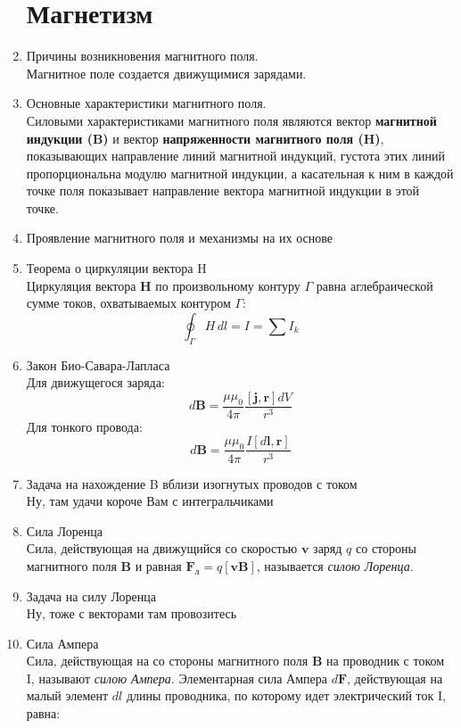 \documentclass[11pt]{article}
\begin{document}
	\begin{enumerate}
		\section{Магнетизм}
		\item Причины возникновения магнитного поля.\\
		Магнитное поле создается движущимися зарядами.
		\item Основные характеристики магнитного поля.\\
		Силовыми характеристиками магнитного поля являются вектор \textbf{магнитной индукции (B)} и вектор \textbf{напряженности магнитного поля (H)}, показывающих направление линий магнитной индукций, густота этих линий пропорциональна модулю магнитной индукции, а касательная к ним в каждой точке поля показывает направление вектора магнитной индукции в этой точке.
		\item Проявление магнитного поля и механизмы на их основе\\
		\item Теорема о циркуляции вектора H\\
		Циркуляция вектора \textbf{H} по произвольному контуру $\Gamma$ равна аглебраической сумме токов, охватываемых контуром $\Gamma$:
		$$
			\oint_\Gamma H\, dl = I = \sum I_k
		$$
		\item Закон Био-Савара-Лапласа\\
		Для движущегося заряда:
		$$
			d\mathbf{B} = \frac{\mu\mu_0}{4\pi}\frac{[\mathbf{j, r}]dV}{r^3}
		$$
		Для тонкого провода:
		$$
			d\mathbf{B} = \frac{\mu\mu_0}{4\pi}\frac{I[d\mathbf{l, r}]}{r^3}
		$$
		\item Задача на нахождение B вблизи изогнутых проводов с током\\
		Ну, там удачи короче Вам с интегральчиками
		\item Сила Лоренца\\
		Сила, действующая на движущийся со скоростью $\mathbf{v}$ заряд $q$ со стороны магнитного поля $\mathbf{B}$ и равная $\mathbf{F}_\text{л} = q[\mathbf{vB}]$, называется \textit{силою Лоренца}.
		\item Задача на силу Лоренца\\
		Ну, тоже с векторами там провозитесь
		\item Сила Ампера\\
		Сила, действующая на со стороны магнитного поля $\mathbf{B}$ на проводник с током I, называют \textit{силою Ампера}. Элементарная сила Ампера $d\mathbf{F}$, действующая на малый элемент $dl$ длины проводника, по которому идет электрический ток I, равна:

\end{enumerate}
\end{document}
